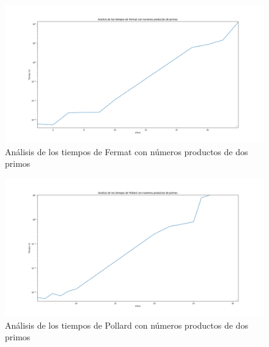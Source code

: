 \documentclass{article}
\begin{document}
    \begin{figure}[ht!]
        \centering
        \includegraphics[scale=0.3]{Figure_4}
        \caption{Análisis de los tiempos de Fermat con números productos de dos primos}
        \label{fig:Figure_4}
    \end{figure}

    \begin{figure}[ht!]
        \centering
        \includegraphics[scale=0.3]{Figure_6}
        \caption{Análisis de los tiempos de Pollard con números productos de dos primos}
        \label{fig:Figure_6}
    \end{figure}

    \newpage
\end{document}
